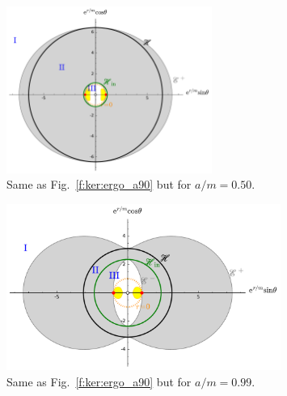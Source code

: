 \begin{figure}
\centerline{\includegraphics[width=0.6\textwidth]{ker_ergo_a50.pdf}}
\caption[]{\label{f:ker:ergo_a50} \footnotesize
Same as Fig.~\ref{f:ker:ergo_a90} but for $a/m=0.50$.
}
\end{figure}

\begin{figure}
\centerline{\includegraphics[width=0.8\textwidth]{ker_ergo_a99.pdf}}
\caption[]{\label{f:ker:ergo_a99} \footnotesize
Same as Fig.~\ref{f:ker:ergo_a90} but for $a/m=0.99$.
}
\end{figure}

